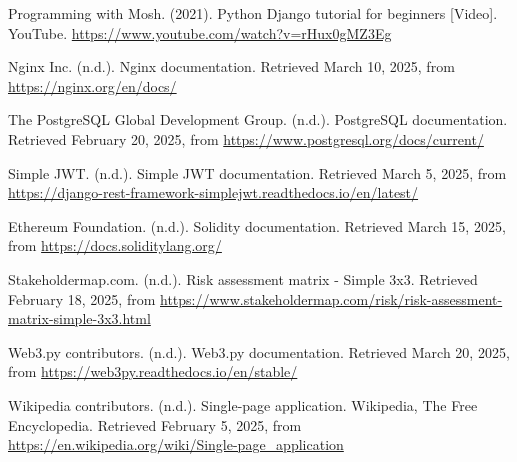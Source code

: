 \begin{thebibliography}{99}
Programming with Mosh. (2021). Python Django tutorial for beginners [Video]. YouTube. \url{https://www.youtube.com/watch?v=rHux0gMZ3Eg}

Nginx Inc. (n.d.). Nginx documentation. Retrieved March 10, 2025, from \url{https://nginx.org/en/docs/}

The PostgreSQL Global Development Group. (n.d.). PostgreSQL documentation. Retrieved February 20, 2025, from \url{https://www.postgresql.org/docs/current/}

Simple JWT. (n.d.). Simple JWT documentation. Retrieved March 5, 2025, from \url{https://django-rest-framework-simplejwt.readthedocs.io/en/latest/}

Ethereum Foundation. (n.d.). Solidity documentation. Retrieved March 15, 2025, from \url{https://docs.soliditylang.org/}

Stakeholdermap.com. (n.d.). Risk assessment matrix - Simple 3x3. Retrieved February 18, 2025, from \url{https://www.stakeholdermap.com/risk/risk-assessment-matrix-simple-3x3.html}

Web3.py contributors. (n.d.). Web3.py documentation. Retrieved March 20, 2025, from \url{https://web3py.readthedocs.io/en/stable/}

Wikipedia contributors. (n.d.). Single-page application. Wikipedia, The Free Encyclopedia. Retrieved February 5, 2025, from \url{https://en.wikipedia.org/wiki/Single-page_application}

\end{thebibliography}
